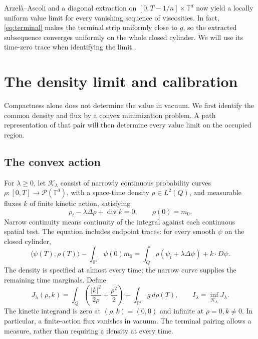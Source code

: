 \documentclass[11pt]{article}
\newcommand{\T}{\mathbb T}
\numberwithin{equation}{section}
\begin{document}
Arzel\`a--Ascoli and a diagonal extraction on \([0,T-1/n]\times\T^d\)
now yield a locally uniform value limit for every vanishing sequence
of viscosities. In fact, \eqref{eq:terminal} makes the terminal strip
uniformly close to \(g\), so the extracted subsequence converges
uniformly on the whole closed cylinder. We will use its time-zero
trace when identifying the limit.

\section{The density limit and calibration}\label{sec:limit}

Compactness alone does not determine the value in vacuum. We first identify
the common density and flux by a convex minimization problem. A path
representation of that pair will then determine every value limit on the
occupied region.

\subsection{The convex action}

For \(\lambda\ge0\), let \(\mathcal K_\lambda\) consist of
narrowly continuous probability curves
\(\rho:[0,T]\to\mathcal P(\T^d)\), with a space-time density
\(\rho\in L^2(Q)\), and measurable fluxes \(k\) of finite kinetic action,
satisfying
\[
 \rho_t-\lambda\Delta\rho+\operatorname{div}k=0,\qquad \rho(0)=m_0 .
\]
Narrow continuity means continuity of the integral against each continuous
spatial test. The equation includes endpoint traces: for every smooth
\(\psi\) on the closed cylinder,
\begin{equation}\label{eq:weak-ce}
 \langle\psi(T),\rho(T)\rangle-\int_{\T^d}\psi(0)m_0
 =\int_Q \rho(\psi_t+\lambda\Delta\psi)+k\cdot D\psi .
\end{equation}
The density is specified at almost every time; the narrow curve supplies
the remaining time marginals. Define
\begin{equation}\label{eq:action}
 J_\lambda(\rho,k)=
 \int_Q\left(\frac{|k|^2}{2\rho}+\frac{\rho^2}{2}\right)
                    +\int_{\T^d}g\,d\rho(T),\qquad
 I_\lambda=\inf_{\mathcal K_\lambda}J_\lambda .
\end{equation}
The kinetic integrand is zero at \((\rho,k)=(0,0)\) and infinite at
\(\rho=0,k\ne0\). In particular, a finite-action flux vanishes in vacuum.
The terminal pairing allows a measure, rather than requiring a density at
every time.
\end{document}
